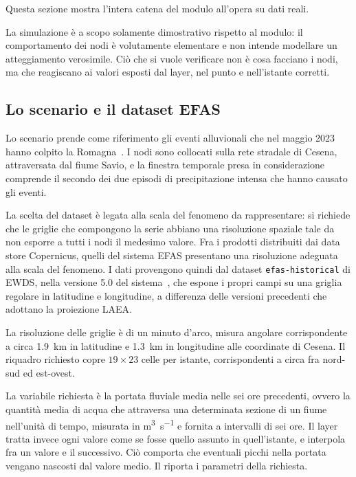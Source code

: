 Questa sezione mostra l'intera catena del modulo all'opera su dati reali.

La simulazione è a scopo solamente dimostrativo
rispetto al modulo: il comportamento dei nodi è volutamente elementare
e non intende modellare un atteggiamento verosimile.
Ciò che si vuole verificare non è cosa facciano i nodi, ma che reagiscano ai
valori esposti dal layer, nel punto e nell'istante corretti.

\subsection{Lo scenario e il dataset EFAS}

Lo scenario prende come riferimento gli eventi alluvionali che nel maggio 2023
hanno colpito la Romagna~\cite{arrighi2024}. I nodi sono collocati sulla rete
stradale di Cesena, attraversata dal fiume Savio, e la finestra temporale
presa in considerazione comprende il secondo dei due episodi di precipitazione
intensa che hanno causato gli eventi.

La scelta del dataset è legata alla scala del fenomeno da rappresentare:
si richiede che le griglie che compongono la serie abbiano
una risoluzione spaziale tale da non esporre
a tutti i nodi il medesimo valore. Fra i prodotti distribuiti
dai data store Copernicus, quelli del sistema \ac{EFAS} presentano una risoluzione
adeguata alla scala del fenomeno. I dati provengono quindi dal dataset
\texttt{efas-historical} di \ac{EWDS}, nella versione 5.0 del sistema~\cite{efasv5},
che espone i propri campi su una griglia regolare in latitudine e longitudine,
a differenza delle versioni precedenti che adottano la proiezione \ac{LAEA}.

La risoluzione delle griglie è di un minuto d'arco, misura angolare corrispondente
a circa \qty{1.9}{\kilo\metre} in latitudine e \qty{1.3}{\kilo\metre} in longitudine
alle coordinate di Cesena.
Il riquadro richiesto copre $19 \times 23$ celle per istante, corrispondenti a
circa  fra nord-sud ed est-ovest.

La variabile richiesta è la portata fluviale media nelle sei ore precedenti,
ovvero la quantità media di acqua che attraversa una determinata sezione di un
fiume nell'unità di tempo, misurata in \unit{\cubic\metre\per\second} e fornita
a intervalli di sei ore. Il layer tratta invece ogni valore
come se fosse quello assunto in quell'istante, e interpola fra un valore e
il successivo. Ciò comporta che eventuali picchi nella portata vengano nascosti
dal valore medio. Il  riporta i parametri
della richiesta.

